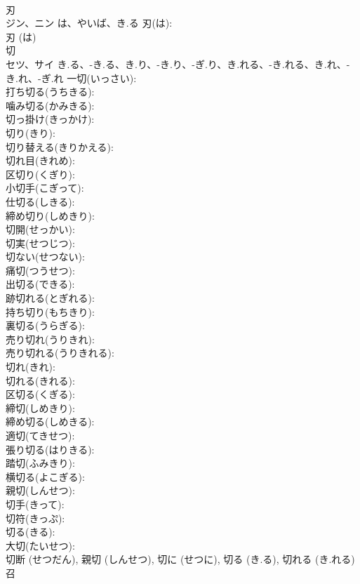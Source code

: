 \documentclass[8pt]{extreport}
\begin{document}
\begin{CJK}{UTF8}{min}
\\	刃			
\\	ジン、ニン	は、やいば、き.る	刃(は): 
\\	刃 (は)
\\	切			
\\	セツ、サイ	き.る、-き.る、き.り、-き.り、-ぎ.り、き.れる、-き.れる、き.れ、-き.れ、-ぎ.れ	一切(いっさい): 
\\	打ち切る(うちきる): 
\\	噛み切る(かみきる): 
\\	切っ掛け(きっかけ): 
\\	切り(きり): 
\\	切り替える(きりかえる): 
\\	切れ目(きれめ): 
\\	区切り(くぎり): 
\\	小切手(こぎって): 
\\	仕切る(しきる): 
\\	締め切り(しめきり): 
\\	切開(せっかい): 
\\	切実(せつじつ): 
\\	切ない(せつない): 
\\	痛切(つうせつ): 
\\	出切る(できる): 
\\	跡切れる(とぎれる): 
\\	持ち切り(もちきり): 
\\	裏切る(うらぎる): 
\\	売り切れ(うりきれ): 
\\	売り切れる(うりきれる): 
\\	切れ(きれ): 
\\	切れる(きれる): 
\\	区切る(くぎる): 
\\	締切(しめきり): 
\\	締め切る(しめきる): 
\\	適切(てきせつ): 
\\	張り切る(はりきる): 
\\	踏切(ふみきり): 
\\	横切る(よこぎる): 
\\	親切(しんせつ): 
\\	切手(きって): 
\\	切符(きっぷ): 
\\	切る(きる): 
\\	大切(たいせつ): 
\\	切断 (せつだん), 親切 (しんせつ), 切に (せつに), 切る (き.る), 切れる (き.れる)
\\	召			

\end{CJK}
\end{document}
